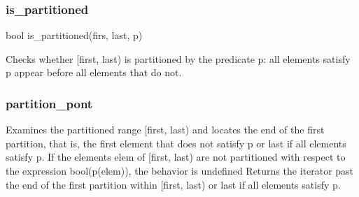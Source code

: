 \documentclass{report}
\begin{document}
 \bigbreak \noindent 
 \subsubsection{is\_partitioned}
 \bigbreak \noindent 
 \begin{cppcode}
 bool is_partitioned(firs, last, p)
 \end{cppcode}
 \bigbreak \noindent 
 Checks whether [first, last) is partitioned by the predicate p: all elements satisfy p appear before all elements that do not.

 \bigbreak \noindent 
 \subsubsection{partition\_pont}
 \bigbreak \noindent 
 Examines the partitioned range [first, last) and locates the end of the first partition, that is, the first element that does not satisfy p or last if all elements satisfy p.
 \bigbreak \noindent 
    If the elements elem of [first, last) are not partitioned with respect to the expression bool(p(elem)), the behavior is undefined
    \bigbreak \noindent 
    Returns the iterator past the end of the first partition within [first, last) or last if all elements satisfy p.
\end{document}
